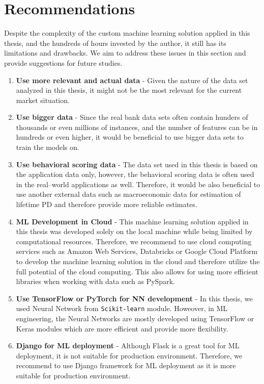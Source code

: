 \section{Recommendations}
Despite the complexity of the custom machine learning solution applied in this thesis, and the hundreds of hours invested by the author, it still has its limitations and drawbacks. We aim to address these issues in this section and provide suggestions for future studies.
\begin{enumerate}\setlength\itemsep{0em}
    \item \textbf{Use more relevant and actual data} - Given the nature of the data set analyzed in this thesis, it might not be the most relevant for the current market situation.
    \item \textbf{Use bigger data} - Since the real bank data sets often contain hunders of thousands or even millions of instances, and the number of features can be in hundreds or even higher, it would be beneficial to use bigger data sets to train the models on.
    \item \textbf{Use behavioral scoring data} - The data set used in this thesis is based on the application data only, however, the behavioral scoring data is often used in the real--world applications as well. Therefore, it would be also beneficial to use another external data such as macroeconomic data for estimation of lifetime PD and therefore provide more reliable estimates.
    \item \textbf{ML Development in Cloud} - This machine learning solution applied in this thesis was developed solely on the local machine while being limited by computational resources. Therefore, we recommend to use cloud computing services such as Amazon Web Services, Databricks or Google Cloud Platform to develop the machine learning solution in the cloud and therefore utilize the full potential of the cloud computing.
    This also allows for using more efficient libraries when working with data such as PySpark.
    \item \textbf{Use TensorFlow or PyTorch for NN development} - In this thesis, we used Neural Network from \lstinline{Scikit-learn} module. Howeover, in ML engineering, the Neural Networks are mostly developed using TensorFlow or Keras modules which are more efficient and provide more flexibility.
    \item \textbf{Django for ML deployment} - Although Flask is a great tool for ML deployment, it is not suitable for production environment. Therefore, we recommend to use Django framework for ML deployment as it is more suitable for production environment.

\end{enumerate}
